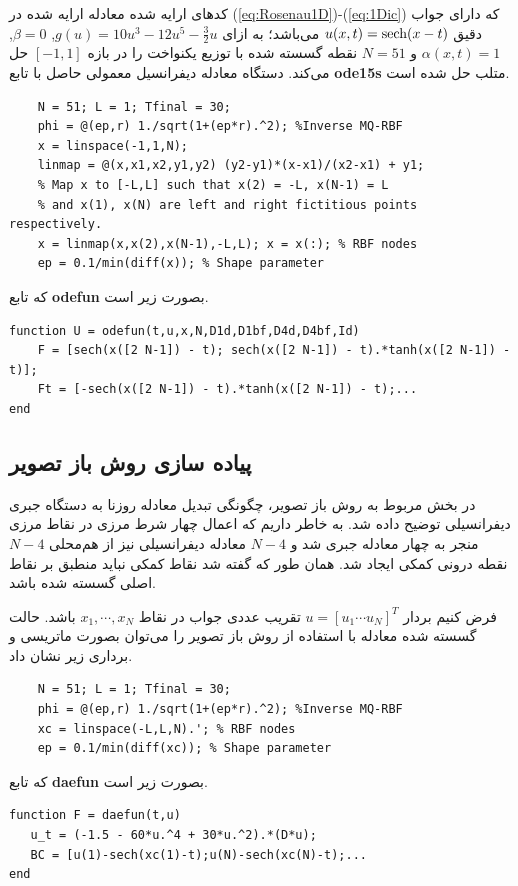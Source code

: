 کدهای ارایه شده معادله ارایه شده در 
(\ref{eq:Rosenau1D})-(\ref{eq:1Dic}) 
که دارای جواب دقیق 
$u(x,t)=\textnormal{sech}(x-t)$
می‌باشد؛ به ازای 
$g(u)=10u^3-12u^5-\frac{3}{2}u$, $\beta=0$, $\alpha(x,t)=1$ 
و 
$N=51$
نقطه گسسته شده با توزیع یکنواخت را در بازه
$[-1,1]$
حل می‌کند. دستگاه معادله دیفرانسیل معمولی حاصل با تابع
\textbf{ode15s}
متلب حل شده است.

\begin{latin} 	
\begin{verbatim}
    N = 51; L = 1; Tfinal = 30;
    phi = @(ep,r) 1./sqrt(1+(ep*r).^2); %Inverse MQ-RBF
    x = linspace(-1,1,N);
    linmap = @(x,x1,x2,y1,y2) (y2-y1)*(x-x1)/(x2-x1) + y1;
    % Map x to [-L,L] such that x(2) = -L, x(N-1) = L
    % and x(1), x(N) are left and right fictitious points respectively.
    x = linmap(x,x(2),x(N-1),-L,L); x = x(:); % RBF nodes
    ep = 0.1/min(diff(x)); % Shape parameter
\end{verbatim}
\end{latin} 	
که تابع
\textbf{odefun}
بصورت زیر است.
\begin{latin} 	
\begin{verbatim}
function U = odefun(t,u,x,N,D1d,D1bf,D4d,D4bf,Id)
    F = [sech(x([2 N-1]) - t); sech(x([2 N-1]) - t).*tanh(x([2 N-1]) - t)];
    Ft = [-sech(x([2 N-1]) - t).*tanh(x([2 N-1]) - t);...
end
\end{verbatim}
\end{latin}

\subsection{ پیاده سازی روش باز تصویر}

در بخش‌ مربوط به روش باز تصویر، چگونگی تبدیل معادله روزنا به دستگاه جبری دیفرانسیلی توضیح داده شد. به خاطر داریم که اعمال چهار شرط مرزی در نقاط مرزی منجر به چهار معادله جبری شد و  
$N-4$
معادله دیفرانسیلی نیز از هم‌محلی 
$N-4$
نقطه درونی کمکی ایجاد شد. همان طور که گفته شد نقاط کمکی نباید منطبق بر نقاط اصلی گسسته شده باشد.

فرض کنیم بردار
$u=[u_1 \cdots u_N]^T$
تقریب عددی جواب در نقاط
$x_1,\cdots,x_N $ 
باشد. حالت گسسته شده معادله با استفاده از روش باز تصویر را می‌توان بصورت ماتریسی و برداری زیر نشان داد.


\begin{latin}
\begin{verbatim}
    N = 51; L = 1; Tfinal = 30;
    phi = @(ep,r) 1./sqrt(1+(ep*r).^2); %Inverse MQ-RBF
    xc = linspace(-L,L,N).'; % RBF nodes
    ep = 0.1/min(diff(xc)); % Shape parameter
\end{verbatim}
\end{latin}
که تابع
\textbf{daefun} 
بصورت زیر است.
\begin{latin}
\begin{verbatim}
function F = daefun(t,u)
   u_t = (-1.5 - 60*u.^4 + 30*u.^2).*(D*u);
   BC = [u(1)-sech(xc(1)-t);u(N)-sech(xc(N)-t);...
end
\end{verbatim}
\end{latin}
%
%
